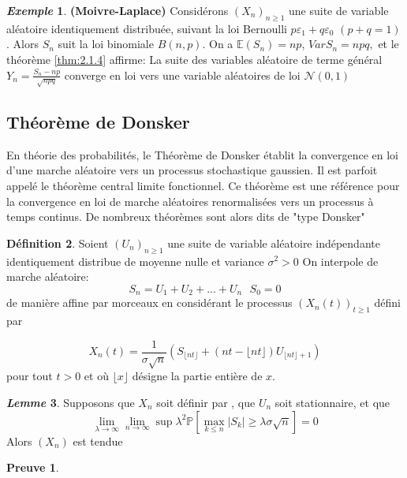 \documentclass[12pt,a4paper,twoside,fleqn]{book}%
\theoremstyle{definition}
\newtheorem{dfn}{Définition}[section]
\newtheorem*{pr}{\textbf{Preuve}}
\theoremstyle{lemme}
\newtheorem{lem}[dfn]{\textit{Lemme}}
\newtheorem{exm}[dfn]{\textit{Exemple}}
\numberwithin{equation}{section}
\begin{document}
\begin{exm}\textbf{(Moivre-Laplace)}
	Considérons $(X_n)_{n\geq1}$ une suite de variable aléatoire identiquement distribuée, suivant la loi Bernoulli $p\varepsilon_1+q\varepsilon_0$ $(p+q=1)$. Alors $S_n$ suit la loi binomiale $B(n,p)$. On a $\mathbb{E}(S_n)=np$, $VarS_n=npq,$ et le théorème \ref{thm:2.1.4} affirme: La suite des variables aléatoire de terme général $Y_n=\frac{S_n-np}{\sqrt{npq}}$ converge en loi vers une variable aléatoires de loi $\mathcal{N}(0,1)$
\end{exm}	
\subsection{Théorème de Donsker}
En théorie des probabilités, le Théorème de Donsker établit la convergence en loi d'une marche aléatoire vers un processus stochastique gaussien. Il est parfoit appelé le théorème central limite fonctionnel. Ce théorème est une référence pour la convergence en loi de marche aléatoires renormalisées vers un processus à temps continus. De nombreux théorèmes sont alors dits de "type Donsker"

\begin{dfn}
	Soient $(U_n)_{n\geq1}$ une suite de variable aléatoire indépendante identiquement distribue de moyenne nulle et variance $\sigma^2>0$
	On interpole de marche aléatoire:
	\[
	S_n = U_1+U_2+...+U_n \text{      } S_0=0
	\] de manière affine par morceaux en considérant le processus $(X_n(t))_{t\geq1}$ défini par 
	
	\begin{equation}\label{eq:2.1.4}
		X_n(t) = \frac{1}{\sigma\sqrt{n}}\left(S_{ \lfloor nt\rfloor} + (nt -\lfloor nt\rfloor )U_{ \lfloor nt\rfloor +1}\right)
	\end{equation}
	pour tout $t>0$ et où $\lfloor x\rfloor$ désigne la partie entière de $x$.
\end{dfn}
\begin{lem}
	Supposons que $X_n$ soit définir par , que $U_n$ soit stationnaire, et que 
	\begin{equation}\label{eq:2.1.5}
		\lim_{\lambda\to \infty}\lim_{n\to\infty}\sup\lambda^2\mathbb{P}\left[\max_{k\leq n}|S_k|\geq \lambda\sigma\sqrt{n}\right]=0
	\end{equation}
	Alors $(X_n)$ est tendue %
\end{lem}
\begin{pr}
	
\end{pr}
\end{document}
